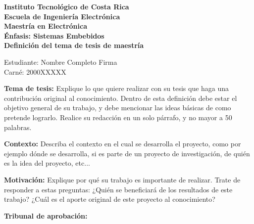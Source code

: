 \documentclass[letterpaper,12pt,spanish]{article}
\begin{document}
\pagestyle{empty}

{\bf Instituto Tecnológico de Costa Rica \\
Escuela de Ingeniería Electrónica \\
Maestría en Electrónica \\
Énfasis: Sistemas Embebidos \\
Definición del tema de tesis de maestría }

\vspace{0.5cm}
Estudiante: Nombre Completo \hfill Firma \underline{\hspace{5.5cm}} \\
Carné: 2000XXXXX


{\vspace{0.5cm} \bf Tema de tesis:} 
{Explique lo que quiere realizar con su tesis que haga una contribución 
original al conocimiento. Dentro de esta definición debe estar el objetivo 
general de su trabajo, y debe mencionar las ideas básicas de como pretende 
lograrlo. Realice su redacción en un solo párrafo, y no mayor a 50 palabras.}


{\vspace{0.5cm} \bf Contexto:} {Describa el contexto en el cual se desarrolla 
el proyecto, como por ejemplo dónde se desarrolla, si es parte de un proyecto 
de investigación, de quién es la idea del proyecto, etc...}



{\vspace{0.5cm} \bf Motivación:} {Explique por qué su trabajo es importante de 
realizar. Trate de responder a estas preguntas: ¿Quién se beneficiará de los 
resultados de este trabajo? ¿Cuál es el aporte original de este proyecto al 
conocimiento?}


\vfill

{\bf Tribunal de aprobación:}
\vspace{0.5cm}
\end{document}
